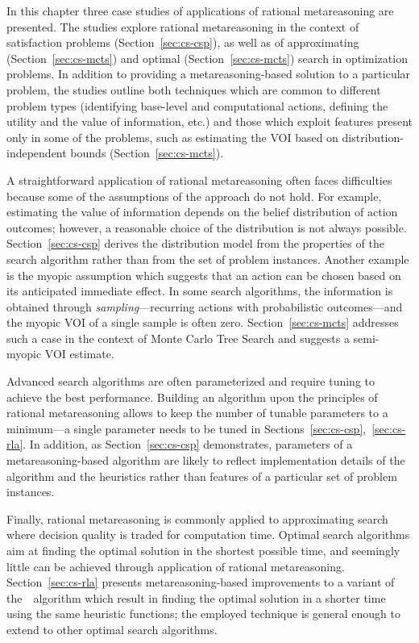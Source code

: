 In this chapter three case studies of applications of rational
metareasoning are presented. The studies explore rational
metareasoning in the context of satisfaction problems
(Section~\ref{sec:cs-csp}), as well as of approximating
(Section~\ref{sec:cs-mcts}) and optimal (Section~\ref{sec:cs-mcts})
search in optimization problems. In addition to providing a
metareasoning-based solution to a particular problem, the studies
outline both techniques which are common to different problem types
(identifying base-level and computational actions, 
defining the utility and the value of information, etc.)
and those which exploit features present only in some of the problems,
such as estimating the VOI based on distribution-independent bounds
(Section~\ref{sec:cs-mcts}). 

A straightforward application of rational metareasoning often faces
difficulties because some of the assumptions of the approach do not
hold. For example, estimating the value of information depends on
the belief distribution of action outcomes; however, a reasonable choice
of the distribution is not always possible. Section~\ref{sec:cs-csp}
derives the distribution model from the properties of the search
algorithm rather than from the set of problem instances. Another
example is the myopic assumption \cite{Russell.right} which suggests
that an action can be chosen based on its anticipated immediate
effect. In some search algorithms, the information is obtained through
\emph{sampling}---recurring actions with probabilistic outcomes---and
the myopic VOI of a single sample is often
zero. Section~\ref{sec:cs-mcts} addresses such a case in the context
of Monte Carlo Tree Search and suggests a semi-myopic VOI estimate.

Advanced search algorithms are often parameterized and require tuning
to achieve the best performance. Building an algorithm upon the
principles of rational metareasoning allows to keep the number of
tunable parameters to a minimum---a single parameter needs to be tuned
in Sections~\ref{sec:cs-csp},~\ref{sec:cs-rla}. In addition, as
Section~\ref{sec:cs-csp} demonstrates, parameters
of a metareasoning-based algorithm are likely to reflect
implementation details of the algorithm and the heuristics rather
than features of a particular set of problem instances.

Finally, rational metareasoning is commonly applied to approximating
search where decision quality is traded for computation time. Optimal
search algorithms aim at finding the optimal solution in the shortest
possible time, and seemingly little can be achieved through
application of rational metareasoning.  Section~\ref{sec:cs-rla}
presents metareasoning-based improvements to a variant of
the~\astar~algorithm which result in finding the optimal solution in a
shorter time using the same heuristic functions; the employed
technique is general enough to extend to other optimal
search algorithms.


